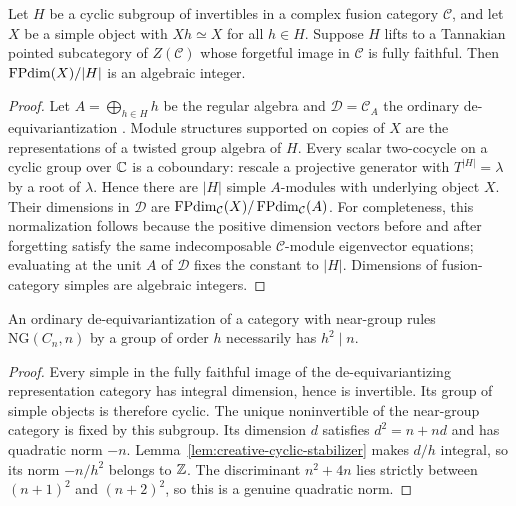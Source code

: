 \begin{lemma}
\label{lem:creative-cyclic-stabilizer}
Let $H$ be a cyclic subgroup of invertibles in a complex fusion category
$\mathcal C$, and let $X$ be a simple object with $Xh\simeq X$ for all
$h\in H$. Suppose $H$ lifts to a Tannakian pointed subcategory of
$Z(\mathcal C)$ whose forgetful image in $\mathcal C$ is fully faithful.
Then $\operatorname{FPdim}(X)/|H|$ is an algebraic integer.
\end{lemma}
\begin{proof}
Let $A=\bigoplus_{h\in H}h$ be the regular algebra and
$\mathcal D=\mathcal C_A$ the ordinary de-equivariantization
\cite[Theorem~8.23.3]{EGNO}. Module structures supported on copies
of $X$ are the representations of a twisted group algebra of $H$.
Every scalar two-cocycle on a cyclic group over $\mathbb C$ is a coboundary:
rescale a projective generator with $T^{|H|}=\lambda$ by a root of
$\lambda$. Hence there are $|H|$ simple $A$-modules with underlying
object $X$. Their dimensions in $\mathcal D$ are
$\operatorname{FPdim}_{\mathcal C}(X)/\operatorname{FPdim}_{\mathcal C}(A)$.
For completeness, this normalization follows because the positive
dimension vectors before and after forgetting satisfy the same
indecomposable $\mathcal C$-module eigenvector equations; evaluating
at the unit $A$ of $\mathcal D$ fixes the constant to $|H|$.
Dimensions of fusion-category simples are algebraic integers.
\end{proof}

\begin{corollary}
\label{cor:creative-ng-square}
An ordinary de-equivariantization of a category with near-group rules
$\mathrm{NG}(C_n,n)$ by a group of order $h$ necessarily has $h^2\mid n$.
\end{corollary}
\begin{proof}
Every simple in the fully faithful image of the de-equivariantizing
representation category has integral dimension, hence is invertible.
Its group of simple objects is therefore cyclic. The unique
noninvertible of the near-group category is fixed by this subgroup.
Its dimension $d$ satisfies $d^2=n+nd$ and has quadratic norm $-n$.
Lemma~\ref{lem:creative-cyclic-stabilizer} makes $d/h$ integral, so its
norm $-n/h^2$ belongs to $\mathbb Z$. The discriminant $n^2+4n$ lies strictly
between $(n+1)^2$ and $(n+2)^2$, so this is a genuine quadratic norm.
\end{proof}


